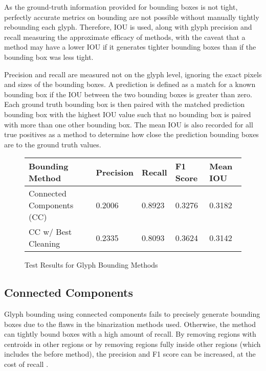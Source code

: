 As the ground-truth information provided for bounding boxes is not tight, perfectly accurate metrics on bounding are not possible without manually tightly rebounding each glyph. Therefore, IOU is used, along with glyph precision and recall measuring the approximate efficacy of methods, with the caveat that a method may have a lower IOU if it generates tighter bounding boxes than if the bounding box was less tight.

Precision and recall are measured not on the glyph level, ignoring the exact pixels and sizes of the bounding boxes. A prediction is defined as a match for a known bounding box if the IOU between the two bounding boxes is greater than zero. Each ground truth bounding box is then paired with the matched prediction bounding box with the highest IOU value such that no bounding box is paired with more than one other bounding box. The mean IOU is also recorded for all true positives as a method to determine how close the prediction bounding boxes are to the ground truth values.

\begin{figure}[H]
    \caption{Test Results for Glyph Bounding Methods}
    \label{fig:boundingEval}
    \centering
    \begin{tabular}{ | l | l | l | l | l | }
        \hline
        Bounding Method & Precision & Recall & F1 Score & Mean IOU \\
        \hline
        Connected Components (CC) & 0.2006 & 0.8923 & 0.3276 & 0.3182 \\
        CC w/ Best Cleaning & 0.2335 & 0.8093 & 0.3624 & 0.3142 \\
        \hline
    \end{tabular}
\end{figure}

\subsection{Connected Components}

Glyph bounding using connected components fails to precisely generate bounding boxes due to the flaws in the binarization methods used. Otherwise, the method can tightly bound boxes with a high amount of recall. By removing regions with centroids in other regions or by removing regions fully inside other regions (which includes the before method), the precision and F1 score can be increased, at the cost of recall .


